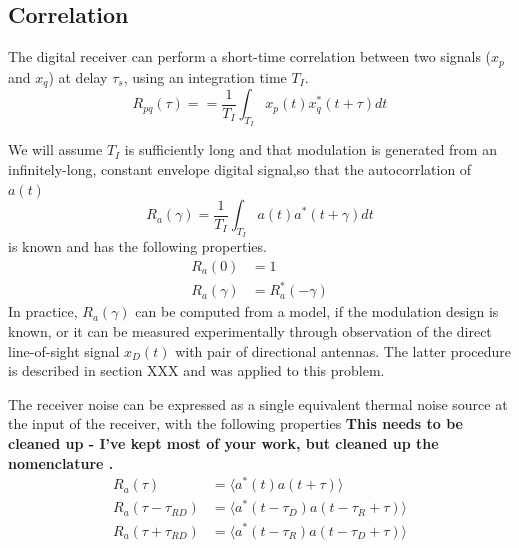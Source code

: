 \documentclass[draftcls,onecolumn]{IEEEtran}  %
\begin{document}
\subsection{Correlation}
The digital receiver can perform a short-time correlation between two signals ($x_p$ and $x_q$) at delay $\tau_s$, using an integration time $T_I$. 
\begin{equation}
	R_{pq}(\tau)  = %
    =\frac{1}{T_I} \int_{T_I}x_p(t) x_q^*(t+\tau)dt 
    \label{Eq: correlation_def}
\end{equation}

We will assume $T_I$ is sufficiently long and that modulation is generated from an infinitely-long, constant envelope digital signal,so that the autocorrlation of $a(t)$ \begin{equation}
R_a (\gamma) = \frac{1}{T_I} \int_{T_I} a(t) a^*(t+\gamma) dt
\end{equation}
is known and has the following properties.
\begin{eqnarray}
   \label{eqn:acfa1}
	R_{a}(0) &= 1   \\
       \label{eqn:acfa2}
    R_{a}(\gamma) & = R_a^* (-\gamma)
\end{eqnarray}
In practice, $R_a(\gamma)$ can be computed from a model, if the modulation design is known, or it can be measured experimentally through observation of the direct line-of-sight signal $x_D(t)$ with pair of directional antennas.  
The latter procedure is described in section XXX and was applied to this problem.  

The receiver noise can be expressed as a single equivalent thermal noise source at the input of the receiver, with the following properties \bf This needs to be cleaned up -  I've kept most of your work, but cleaned up the nomenclature \rm. 
\begin{equation}
\begin{split}
	R_a(\tau)&=\langle a^*(t)a(t +\tau)\rangle \\
    R_a(\tau-\tau_{RD})&=\langle a^*(t-\tau_D)a(t -\tau_R+\tau)\rangle \\
    R_a(\tau+\tau_{RD})&=\langle a^*(t-\tau_R)a(t -\tau_D+\tau)\rangle \\
 \end{split}
\end{equation}
\end{document}
